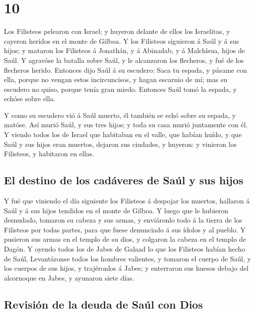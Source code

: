 \hypertarget{section-9}{%
\section{10}\label{section-9}}

 Los Filisteos pelearon con Israel; y huyeron delante de
ellos los Israelitas, y cayeron heridos en el monte de Gilboa.
 Y los Filisteos siguieron á Saúl y á sus hijos; y mataron
los Filisteos á Jonathán, y á Abinadab, y á Malchîsua, hijos de Saúl.
 Y agravóse la batalla sobre Saúl, y le alcanzaron los
flecheros, y fué de los flecheros herido.  Entonces dijo
Saúl á su escudero: Saca tu espada, y pásame con ella, porque no vengan
estos incircuncisos, y hagan escarnio de mí; mas su escudero no quiso,
porque tenía gran miedo. Entonces Saúl tomó la espada, y echóse sobre
ella.

 Y como su escudero vió á Saúl muerto, él también se echó
sobre su espada, y matóse.  Así murió Saúl, y sus tres
hijos; y toda su casa murió juntamente con él.  Y viendo
todos los de Israel que habitaban en el valle, que habían huído, y que
Saúl y sus hijos eran muertos, dejaron sus ciudades, y huyeron: y
vinieron los Filisteos, y habitaron en ellas.

\hypertarget{el-destino-de-los-caduxe1veres-de-sauxfal-y-sus-hijos}{%
\subsection{El destino de los cadáveres de Saúl y sus
hijos}\label{el-destino-de-los-caduxe1veres-de-sauxfal-y-sus-hijos}}

 Y fué que viniendo el día siguiente los Filisteos á
despojar los muertos, hallaron á Saúl y á sus hijos tendidos en el monte
de Gilboa.  Y luego que le hubieron desnudado, tomaron su
cabeza y sus armas, y enviáronlo todo á la tierra de los Filisteos por
todas partes, para que fuese denunciado á sus ídolos y al pueblo.
 Y pusieron sus armas en el templo de su dios, y colgaron
la cabeza en el templo de Dagón.  Y oyendo todos los de
Jabes de Galaad lo que los Filisteos habían hecho de Saúl,
 Levantáronse todos los hombres valientes, y tomaron el
cuerpo de Saúl, y los cuerpos de sus hijos, y trajéronlos á Jabes; y
enterraron sus huesos debajo del alcornoque en Jabes, y ayunaron siete
días.

\hypertarget{revisiuxf3n-de-la-deuda-de-sauxfal-con-dios}{%
\subsection{Revisión de la deuda de Saúl con
Dios}\label{revisiuxf3n-de-la-deuda-de-sauxfal-con-dios}}

